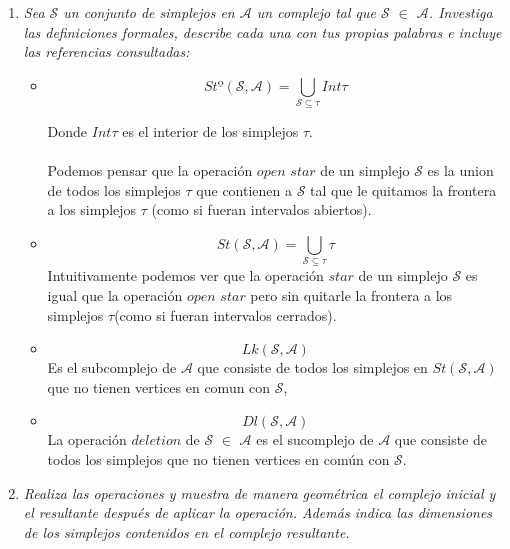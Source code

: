 \documentclass{article}
\begin{document}
\begin{enumerate}
  \item{
      \textsl{
    Sea $\mathcal{S}$ un conjunto de simplejos en $\mathcal{A}$ un
    complejo tal que $\mathcal{S}$ $\in$ $\mathcal{A}$. Investiga las
    definiciones formales, describe cada una con tus propias palabras
    e incluye las referencias consultadas:
    }
    \begin{itemize}
      
    \item{
          \[
           Stº(\mathcal{S}, \mathcal{A}) =  \bigcup_{\mathcal{S}
             \subseteq \tau} Int \tau 
          \]

          Donde $Int\tau$ es el interior de los simplejos $\tau$.\\\\
          Podemos pensar que la operación $open$ $star$ de un simplejo
          $\mathcal{S}$ es la union de
          todos los simplejos $\tau$ que contienen a $\mathcal{S}$
          tal que le quitamos la frontera a los simplejos $\tau$
          (como si fueran intervalos abiertos).
      }
      
    \item{
        \[
           St(\mathcal{S}, \mathcal{A}) =  \bigcup_{\mathcal{S}
             \subseteq \tau} \tau 
           \]
           Intuitivamente podemos ver que la operación $star$ de un
           simplejo $\mathcal{S}$ es igual que la operación $open$
           $star$ pero sin quitarle la frontera a los simplejos
           $\tau$(como si fueran intervalos cerrados).
         }

    \item{
        \[
        Lk(\mathcal{S}, \mathcal{A})
        \]
        Es el subcomplejo de $\mathcal{A}$ que consiste de todos los
        simplejos en $St(\mathcal{S},\mathcal{A})$ que no tienen
        vertices en comun con $\mathcal{S}$,
      }

    \item{
        \[
        Dl(\mathcal{S},\mathcal{A})
        \]
        La operación $deletion$ de $\mathcal{S}$ $\in$ $\mathcal{A}$
        es el sucomplejo de $\mathcal{A}$ que consiste de todos los
        simplejos que no tienen vertices en común con $\mathcal{S}$.
        }
    \end{itemize}

  
  }

\item{
    \textsl{
      Realiza las operaciones y muestra de manera geométrica el
      complejo inicial y el resultante después de aplicar la operación.
      Además indica las dimensiones de los simplejos contenidos en el
      complejo resultante.
    }

}
\end{enumerate}
\end{document}
